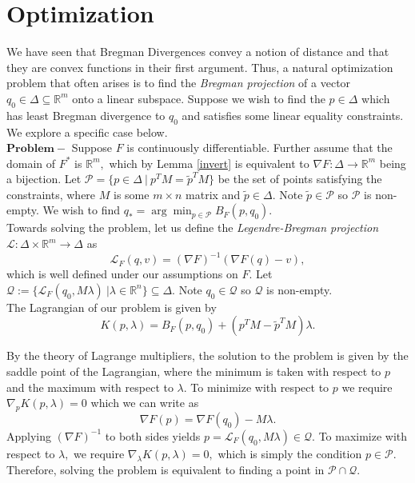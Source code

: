 \documentclass[BSc]{usydthesis}
\numberwithin{equation}{chapter}
\theoremstyle{remark}
\newcommand{\la}{\lambda}
\newcommand{\Lag}{\mathcal{L}}
\begin{document}
\section{Optimization}

We have seen that Bregman Divergences convey a notion of distance and that they are convex functions in their first argument. Thus, a natural optimization problem that often arises is to find the {\em Bregman projection} of a vector $q_0 \in \Delta \subseteq \mathbb{R}^m$ onto a linear subspace. Suppose we wish to find the $p\in \Delta$ which has least Bregman divergence to $q_0$ and satisfies some linear equality constraints. We explore a specific case below. \
\newline \\

$\mathbf{Problem}-$
Suppose $F$ is continuously differentiable. Further assume that the domain of $F^*$ is $\mathbb{R}^m,$ which by Lemma \ref{invert}  is equivalent to $\nabla F : \Delta \to \mathbb{R}^m$ being a bijection. Let $\mathcal{P} = \{ p \in \Delta \ | \ p^TM = \tilde{p}^TM\}$ be the set of points satisfying the constraints, where $M$ is some $m\times n$ matrix and $\tilde{p}\in \Delta.$ Note $\tilde{p}\in\mathcal{P}$ so $\mathcal{P}$ is non-empty. We wish to find $q_*=\arg \min_{p\in \mathcal{P}} B_F(p, q_0).$\
\newline \\
Towards solving the problem, let us define the {\em Legendre-Bregman projection} $\Lag : \Delta \times \mathbb{R}^m \to \Delta$ as
$$ \Lag_F(q,v) = (\nabla F)^{-1} ( \nabla F (q) - v),$$
which is well defined under our assumptions on $F.$ Let $\mathcal{Q} := \{ \mathcal{L}_F(q_0, M\lambda) \ | \lambda \in \mathbb{R}^n \} \subseteq \Delta.$ Note $q_0\in\mathcal{Q}$ so $\mathcal{Q}$ is non-empty.\
\newline \\
The Lagrangian of our problem is given by $$K(p,\lambda) = B_F(p,q_0) + (p^TM - \tilde{p}^TM)\lambda.$$

By the theory of Lagrange multipliers, the solution to the problem is given by the saddle point of the Lagrangian, where the minimum is taken with respect to $p$ and the maximum with respect to $\la.$ To minimize with respect to $p$ we require
$\nabla_p K(p,\lambda) = 0$ which we can write as  $$\nabla F(p) = \nabla F(q_0) - M\lambda.$$ Applying $(\nabla F)^{-1}$ to both sides yields $p = \mathcal{L}_F(q_0, M\lambda)\in \mathcal{Q}.$ To maximize with respect to $\la,$ we require $\nabla_{\lambda} K(p,\lambda)= 0,$ which is simply the condition  $p \in \mathcal{P}.$ Therefore, solving the problem is equivalent to finding a point in $\mathcal{P}\cap \mathcal{Q}.$ \\
\end{document}
